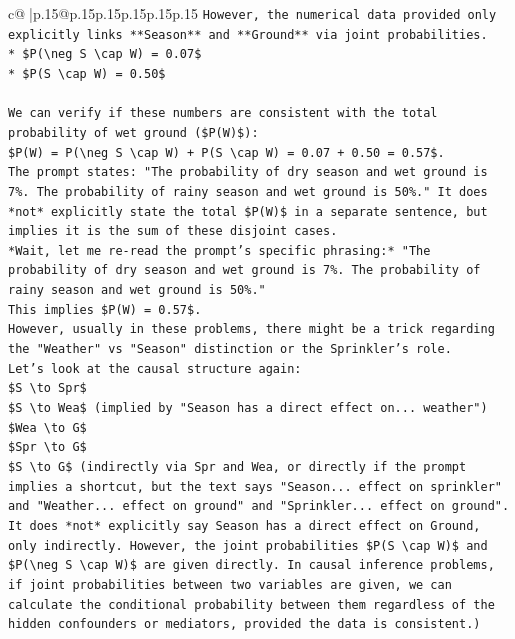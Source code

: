 \documentclass{article}
\begin{document}
{\begin{supertabular}{c@{$\;$}|p{.15\linewidth}@{}p{.15\linewidth}p{.15\linewidth}p{.15\linewidth}p{.15\linewidth}p{.15\linewidth}}
{{{\texttt{However, the numerical data provided only explicitly links **Season** and **Ground** via joint probabilities.} \\
\texttt{*   \$P(\textbackslash{}neg S \textbackslash{}cap W) = 0.07\$} \\
\texttt{*   \$P(S \textbackslash{}cap W) = 0.50\$} \\
\\ 
\texttt{We can verify if these numbers are consistent with the total probability of wet ground (\$P(W)\$):} \\
\texttt{\$P(W) = P(\textbackslash{}neg S \textbackslash{}cap W) + P(S \textbackslash{}cap W) = 0.07 + 0.50 = 0.57\$.} \\
\texttt{The prompt states: "The probability of dry season and wet ground is 7\%. The probability of rainy season and wet ground is 50\%." It does *not* explicitly state the total \$P(W)\$ in a separate sentence, but implies it is the sum of these disjoint cases.} \\
\texttt{*Wait, let me re{-}read the prompt's specific phrasing:* "The probability of dry season and wet ground is 7\%. The probability of rainy season and wet ground is 50\%."} \\
\texttt{This implies \$P(W) = 0.57\$.} \\
\texttt{However, usually in these problems, there might be a trick regarding the "Weather" vs "Season" distinction or the Sprinkler's role.} \\
\texttt{Let's look at the causal structure again:} \\
\texttt{\$S \textbackslash{}to Spr\$} \\
\texttt{\$S \textbackslash{}to Wea\$ (implied by "Season has a direct effect on... weather")} \\
\texttt{\$Wea \textbackslash{}to G\$} \\
\texttt{\$Spr \textbackslash{}to G\$} \\
\texttt{\$S \textbackslash{}to G\$ (indirectly via Spr and Wea, or directly if the prompt implies a shortcut, but the text says "Season... effect on sprinkler" and "Weather... effect on ground" and "Sprinkler... effect on ground". It does *not* explicitly say Season has a direct effect on Ground, only indirectly. However, the joint probabilities \$P(S \textbackslash{}cap W)\$ and \$P(\textbackslash{}neg S \textbackslash{}cap W)\$ are given directly. In causal inference problems, if joint probabilities between two variables are given, we can calculate the conditional probability between them regardless of the hidden confounders or mediators, provided the data is consistent.)} \\
}}}
\end{supertabular}}
\end{document}
